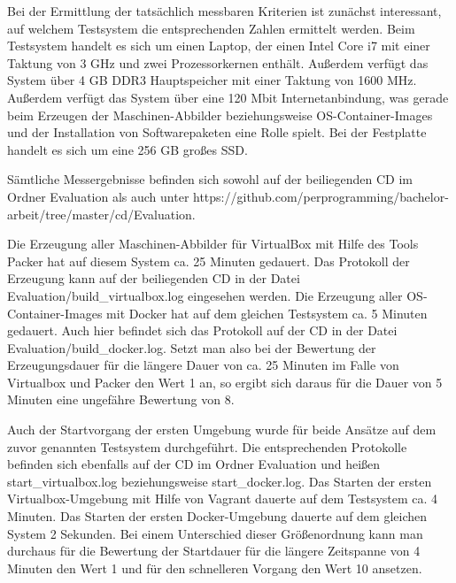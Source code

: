 Bei der Ermittlung der tatsächlich messbaren Kriterien ist zunächst interessant, auf welchem Testsystem die entsprechenden Zahlen ermittelt werden. Beim Testsystem handelt es sich um einen Laptop, der einen Intel Core i7 mit einer Taktung von 3 GHz und zwei Prozessorkernen enthält. Außerdem verfügt das System über 4 GB DDR3 Hauptspeicher mit einer Taktung von 1600 MHz. Außerdem verfügt das System über eine 120 Mbit Internetanbindung, was gerade beim Erzeugen der Maschinen-Abbilder beziehungsweise OS-Container-Images und der Installation von Softwarepaketen eine Rolle spielt. Bei der Festplatte handelt es sich um eine 256 GB großes \ac{SSD}.

Sämtliche Messergebnisse befinden sich sowohl auf der beiliegenden CD im Ordner Evaluation als auch unter https://github.com/perprogramming/bachelor-arbeit/tree/master/cd/Evaluation.

Die Erzeugung aller Maschinen-Abbilder für VirtualBox mit Hilfe des Tools Packer hat auf diesem System ca. 25 Minuten gedauert. Das Protokoll der Erzeugung kann auf der beiliegenden CD in der Datei Evaluation/build\_virtualbox.log eingesehen werden. Die Erzeugung aller OS-Container-Images mit Docker hat auf dem gleichen Testsystem ca. 5 Minuten gedauert. Auch hier befindet sich das Protokoll auf der CD in der Datei Evaluation/build\_docker.log. Setzt man also bei der Bewertung der Erzeugungsdauer für die längere Dauer von ca. 25 Minuten im Falle von Virtualbox und Packer den Wert 1 an, so ergibt sich daraus für die Dauer von 5 Minuten eine ungefähre Bewertung von 8.

Auch der Startvorgang der ersten Umgebung wurde für beide Ansätze auf dem zuvor genannten Testsystem durchgeführt. Die entsprechenden Protokolle befinden sich ebenfalls auf der CD im Ordner Evaluation und heißen start\_virtualbox.log beziehungsweise start\_docker.log. Das Starten der ersten Virtualbox-Umgebung mit Hilfe von Vagrant dauerte auf dem Testsystem ca. 4 Minuten. Das Starten der ersten Docker-Umgebung dauerte auf dem gleichen System 2 Sekunden. Bei einem Unterschied dieser Größenordnung kann man durchaus für die Bewertung der Startdauer für die längere Zeitspanne von 4 Minuten den Wert 1 und für den schnelleren Vorgang den Wert 10 ansetzen.

